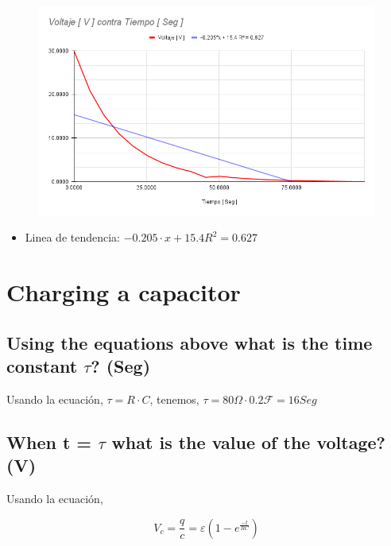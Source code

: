 \documentclass[twocolumn, 12pt]{article}
\begin{document}
\begin{figure}[H]
    \centering
    \includegraphics[width=\linewidth]{./Images/Voltaje [ V ] contra Tiempo [ Seg ] Descarga.png}
\end{figure}

\begin{itemize}[label=$\triangleright$]
    \item Linea de tendencia:\hfill \break{} $-0.205 \cdot x + 15.4
              R^2 = 0.627$
\end{itemize}

\section{Charging a capacitor}

\subsection{Using the equations above what is the time constant $\tau$? (Seg)}

Usando la ecuación, $\tau = R \cdot C$, tenemos, $\tau = 80
    \Omega \cdot 0.2 \mathcal{F} = 16 Seg$

\subsection{When t = $\tau$ what is the value of the voltage? (V)}

Usando la ecuación,

{\large
        \begin{equation}
            V_c = \frac{q}{c} = \varepsilon (1 - e^{\frac{-t}{RC}})
            \label{eq:voltaje__Carga}
        \end{equation}
    }
\end{document}
